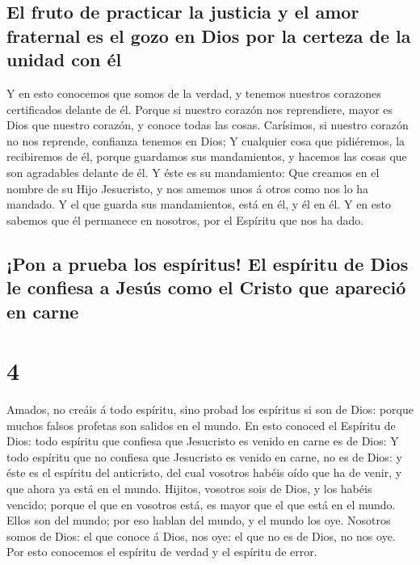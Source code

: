 \hypertarget{el-fruto-de-practicar-la-justicia-y-el-amor-fraternal-es-el-gozo-en-dios-por-la-certeza-de-la-unidad-con-uxe9l}{%
\subsection{El fruto de practicar la justicia y el amor fraternal es el
gozo en Dios por la certeza de la unidad con
él}\label{el-fruto-de-practicar-la-justicia-y-el-amor-fraternal-es-el-gozo-en-dios-por-la-certeza-de-la-unidad-con-uxe9l}}

 Y en esto conocemos que somos de la verdad, y tenemos
nuestros corazones certificados delante de él.  Porque si
nuestro corazón nos reprendiere, mayor es Dios que nuestro corazón, y
conoce todas las cosas.  Carísimos, si nuestro corazón no
nos reprende, confianza tenemos en Dios;  Y cualquier
cosa que pidiéremos, la recibiremos de él, porque guardamos sus
mandamientos, y hacemos las cosas que son agradables delante de él.
 Y éste es su mandamiento: Que creamos en el nombre de su
Hijo Jesucristo, y nos amemos unos á otros como nos lo ha mandado.
 Y el que guarda sus mandamientos, está en él, y él en
él. Y en esto sabemos que él permanece en nosotros, por el Espíritu que
nos ha dado.

\hypertarget{pon-a-prueba-los-espuxedritus-el-espuxedritu-de-dios-le-confiesa-a-jesuxfas-como-el-cristo-que-apareciuxf3-en-carne}{%
\subsection{¡Pon a prueba los espíritus! El espíritu de Dios le confiesa
a Jesús como el Cristo que apareció en
carne}\label{pon-a-prueba-los-espuxedritus-el-espuxedritu-de-dios-le-confiesa-a-jesuxfas-como-el-cristo-que-apareciuxf3-en-carne}}

\hypertarget{section-62-4}{%
\section{4}\label{section-62-4}}

 Amados, no creáis á todo espíritu, sino probad los
espíritus si son de Dios: porque muchos falsos profetas son salidos en
el mundo.  En esto conoced el Espíritu de Dios: todo
espíritu que confiesa que Jesucristo es venido en carne es de Dios:
 Y todo espíritu que no confiesa que Jesucristo es venido
en carne, no es de Dios: y éste es el espíritu del anticristo, del cual
vosotros habéis oído que ha de venir, y que ahora ya está en el mundo.
 Hijitos, vosotros sois de Dios, y los habéis vencido;
porque el que en vosotros está, es mayor que el que está en el mundo.
 Ellos son del mundo; por eso hablan del mundo, y el mundo
los oye.  Nosotros somos de Dios: el que conoce á Dios,
nos oye: el que no es de Dios, no nos oye. Por esto conocemos el
espíritu de verdad y el espíritu de error.

